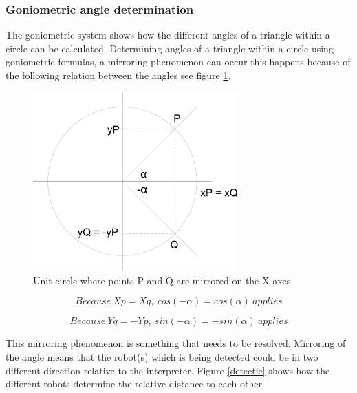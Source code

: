 \documentclass[10pt,a4paper]{article}
\begin{document}
\subsubsection{Goniometric angle determination}
The goniometric system shows how the different angles of a triangle within a circle can be calculated. Determining angles of a triangle within a circle using goniometric formulas, a mirroring phenomenon can occur this happens because of the following relation between the angles see figure \ref{circle}.

\begin{figure}[H]
\centering
\includegraphics[width=0.7\textwidth]{Cirkel.pdf}
\caption{Unit circle where points P and Q are mirrored on the X-axes}
\label{circle}
\end{figure}

\begin{equation}
Because\ Xp = Xq,\ cos(-\alpha) = cos(\alpha)\ applies
\end{equation}

\begin{equation}
Because\ Yq = -Yp,\ sin(-\alpha) = -sin(\alpha)\ applies
\end{equation}

This mirroring phenomenon is something that needs to be resolved. Mirroring of the angle means that the robot(s) which is being detected could be in two different direction relative to the interpreter. Figure \ref{detectie} shows how the different robots determine the relative distance to each other. 

\end{document}
